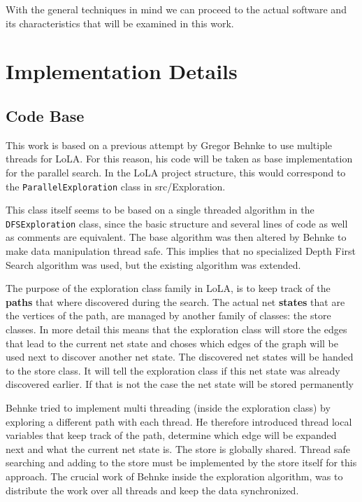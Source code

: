 With the general techniques in mind we can proceed to the actual software and its characteristics that will be examined in this work.

\section{Implementation Details}
\subsection{Code Base}
This work is based on a previous attempt by Gregor Behnke to use multiple threads for LoLA. For this reason, his code will be taken as base implementation for the parallel search. In the LoLA project structure, this would correspond to the \texttt{ParallelExploration} class in src/Exploration.

This class itself seems to be based on a single threaded algorithm in the \texttt{DFSExploration} class, since the basic structure and several lines of code as well as comments are equivalent. The base algorithm was then altered by Behnke to make data manipulation thread safe. This implies that no specialized Depth First Search algorithm was used, but the existing algorithm was extended.

The purpose of the exploration class family in LoLA, is to keep track of the \textbf{paths} that where discovered during the search. The actual net \textbf{states} that are the vertices of the path, are managed by another family of classes: the store classes. In more detail this means that the exploration class will store the edges that lead to the current net state and choses which edges of the graph will be used next to discover another net state. The discovered net states will be handed to the store class. It will tell the exploration class if this net state was already discovered earlier. If that is not the case the net state will be stored permanently

Behnke tried to implement multi threading (inside the exploration class) by exploring a different path with each thread. He therefore introduced thread local variables that keep track of the path, determine which edge will be expanded next and what the current net state is. The store is globally shared. Thread safe searching and adding to the store must be implemented by the store itself for this approach. The crucial work of Behnke inside the exploration algorithm, was to distribute the work over all threads and keep the data synchronized.

